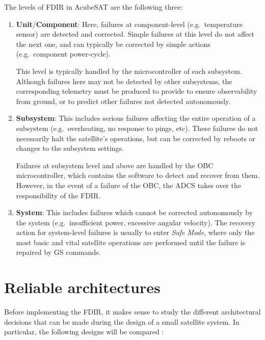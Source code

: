 \documentclass[a4paper,nobib,final]{tufte-book}
\begin{document}
The levels of \acs{FDIR} in AcubeSAT are the following three:
\begin{enumerate}[label=Level \arabic*]
	\item \textbf{Unit}/\textbf{Component}: Here, failures at component-level (e.g.\ temperature sensor) are detected and corrected. Simple failures at this level do not affect the next one, and can typically be corrected by simple actions (e.g.\ component power-cycle).
	
	This level is typically handled by the microcontroller of each subsystem. Although failures here may not be detected by other subsystems, the corresponding telemetry must be produced to provide to ensure observability from ground, or to predict other failures not detected autonomously.
	\item \textbf{Subsystem}: This includes serious failures affecting the entire operation of a subsystem (e.g.\ overheating, no response to pings, etc). These failures do not necessarily halt the satellite's operations, but can be corrected by reboots or changes to the subsystem settings.
	
	Failures at subsystem level and above are handled by the \acf{OBC} microcontroller, which contains the software to detect and recover from them. However, in the event of a failure of the \acs{OBC}, the \ac{ADCS} takes over the responsibility of the \acs{FDIR}.
	\item \textbf{System}: This includes failures which cannot be corrected au\-to\-nom\-ous\-ly by the system (e.g.\ insufficient power, excessive angular velocity). The recovery action for system-level failures is usually to enter \emph{Safe Mode}, where only the most basic and vital satellite operations are performed until the failure is repaired by \acl{GS} commands.
\end{enumerate}

\section{Reliable architectures}
\label{sec:theoretical}

Before implementing the \acs{FDIR}, it makes sense to study the different architectural decisions that can be made during the design of a small satellite system. In particular, the following designs will be compared \autocite{birolini_reliability_engineering_2004}:
\end{document}
